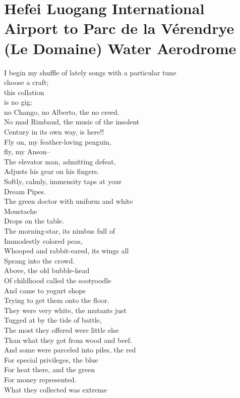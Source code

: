 \documentclass[smalldemyvopaper,11pt,twoside,onecolumn,openright,extrafontsizes]{memoir}
\begin{document}
\chapter{Hefei Luogang International Airport to Parc de la Vérendrye (Le Domaine) Water Aerodrome}
I begin my shuffle of lately songs with a particular tune
\\choose a craft;
\\this collation
\\is no gig;
\\no Chango, no Alberto, the no creed.
\\No mad Rimbaud, the music of the insolent
\\Century in its own way, is here!!
\\Fly on, my feather-loving penguin,
\\fly, my Anson--
\\The elevator man, admitting defeat,
\\Adjusts his gear on his fingers.
\\Softly, calmly, immensity taps at your
\\Dream Pipes.
\\The green doctor with uniform and white
\\Moustache
\\Drops on the table.
\\The morning-star, its nimbus full of
\\Immodestly colored peas,
\\Whooped and rabbit-eared, its wings all
\\Sprang into the crowd.
\\Above, the old bubble-head
\\Of childhood called the sootyoodle
\\And came to yogurt shops
\\Trying to get them onto the floor.
\\They were very white, the mutants just
\\Tugged at by the tide of battle,
\\The most they offered were little else
\\Than what they got from wood and beef.
\\And some were parceled into piles, the red
\\For special privileges, the blue
\\For heat there, and the green
\\For money represented.
\\What they collected was extreme
\end{document}
